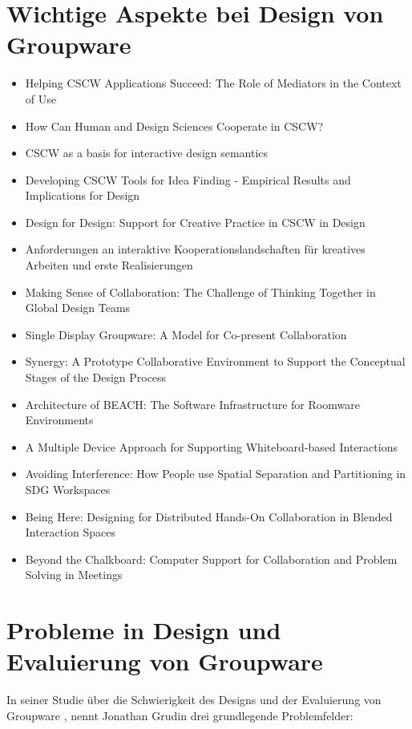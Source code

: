 \section{Wichtige Aspekte bei Design von Groupware}
\begin{itemize}
	\item {Helping CSCW Applications Succeed: The Role of Mediators in the Context of Use}
	\item {How Can Human and Design Sciences Cooperate in CSCW?}
	\item {CSCW as a basis for interactive design semantics}
	\item {Developing CSCW Tools for Idea Finding - Empirical Results and Implications for Design}
	\item {Design for Design: Support for Creative Practice in CSCW in Design}
	\item {Anforderungen an interaktive Kooperationslandschaften für kreatives Arbeiten und erste Realisierungen}
	\item {Making Sense of Collaboration: The Challenge of Thinking Together in Global Design Teams}
	\item {Single Display Groupware: A Model for Co-present Collaboration}
	\item {Synergy: A Prototype Collaborative Environment to Support the Conceptual Stages of the Design Process}
	\item {Architecture of BEACH: The Software Infrastructure for Roomware Environments}
	\item {A Multiple Device Approach for Supporting Whiteboard-based Interactions}
	\item {Avoiding Interference: How People use Spatial Separation and Partitioning in SDG Workspaces}
	\item {Being Here: Designing for Distributed Hands-On Collaboration in Blended Interaction Spaces}
	\item {Beyond the Chalkboard: Computer Support for Collaboration and Problem Solving in Meetings}
\end{itemize}

\section{Probleme in Design und Evaluierung von Groupware}

In seiner Studie über die Schwierigkeit des Designs und der Evaluierung von Groupware \citep{Grudin:1988p126}, nennt Jonathan Grudin drei grundlegende Problemfelder:

